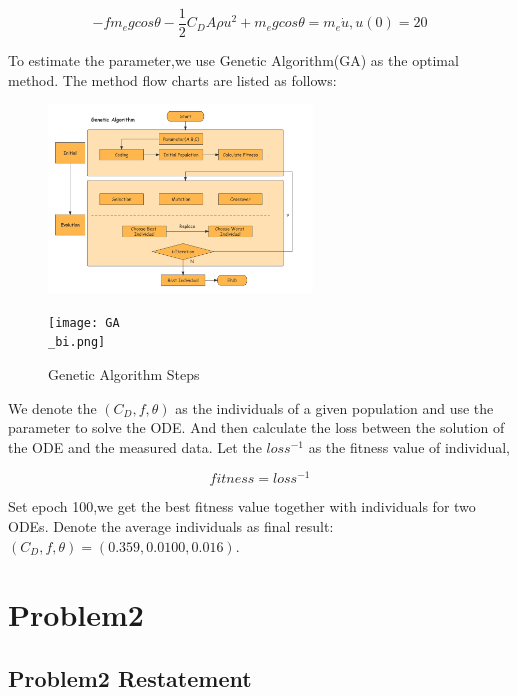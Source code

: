 \documentclass[UTF8,a4paper,11pt]{article}
\begin{document}
\begin{equation}
 -fm_egcos\theta-\frac{1}{2}C_DA\rho u^2 + m_egcos\theta = m_e\dot{u},
 u(0) = 20
\end{equation}

To estimate the parameter,we use Genetic Algorithm(GA) as the optimal method. The method flow charts are listed as follows:

  \begin{figure}[htbp]
  	\begin{minipage}[t]{0.45\linewidth}
  		\centering
  		\includegraphics[width=7cm]{GA.jpg}
  	\end{minipage}
  	\begin{minipage}[t]{0.45\linewidth}        %
  		\hspace{2mm}
  		\texttt{[image: GA\\\_bi.png]}
  	\end{minipage}
  	\caption{Genetic Algorithm Steps}
  \end{figure}
  
We denote the $( C_D,f,\theta ) $ as the individuals of a given population and use the parameter to solve the ODE. And then calculate the loss between the solution of the ODE and the measured data. Let the $loss^{-1}$ as the fitness value of individual,

\begin{equation}
fitness = loss^{-1}
\end{equation}

Set epoch 100,we get the best fitness value together with individuals for two ODEs. Denote the average individuals as final result: $( C_D,f,\theta )=(0.359,0.0100,0.016)$.

\section{Problem2}
\subsection{Problem2 Restatement}
\end{document}
